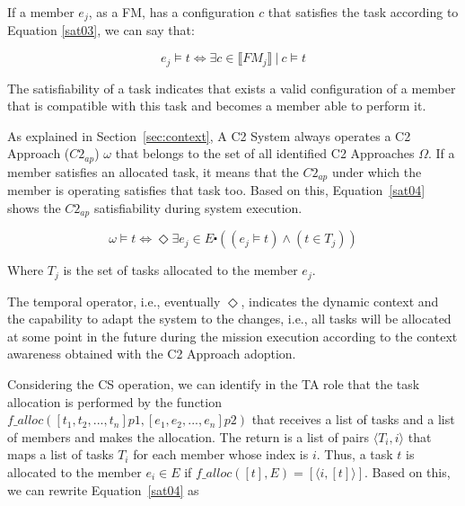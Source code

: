 

If a member $e_j$, as a FM, has a configuration $c$ that satisfies the task according to Equation \ref{sat03}, we can say that:

\begin{center}
\begin{equation}
\label{sat02}
e_j \models t \Longleftrightarrow \exists c \in \llbracket FM_j \rrbracket \ | \ c \models t
\end{equation}
\end{center}

The satisfiability of a task indicates that exists a valid configuration of a member that is compatible with this task and becomes a member able to perform it. 

As explained in Section~\ref{sec:context}, A C2 System always operates a C2 Approach ($C2_{ap}$) $\omega$ that belongs to the set of all identified C2 Approaches $\Omega$. If a member satisfies an allocated task, it means that the $C2_{ap}$ under which the member is operating satisfies that task too. Based on this, Equation~\ref{sat04} shows the $C2_{ap}$ satisfiability during system execution.

\begin{center}
\begin{equation}
\label{sat04}
\omega \models t \Longleftrightarrow  \Diamond \exists e_j \in E \centerdot  ((e_j \models t) \land (t \in T_j))
\end{equation}
\end{center}

Where $T_j$ is the set of tasks allocated to the member $e_j$.

The temporal operator, i.e., eventually $\Diamond$, indicates the dynamic context and the capability to adapt the system to the changes, i.e., all tasks will be allocated at some point in the future during the mission execution according to the context awareness obtained with the C2 Approach adoption.

Considering the CS operation, we can identify in the TA role that the task allocation is performed by the function $f\_alloc([t_1, t_2, ..., t_n] p1, [e_1, e_2, ..., e_n] p2)$ that receives a list of tasks and a list of members and makes the allocation. The return is a list of pairs $\langle T_i, i \rangle$ that maps a list of tasks $T_i$ for each member whose index is $i$. Thus, a task $t$ is allocated to the member $e_i \in E$ if $f\_alloc([t],E)=[\langle i, [t] \rangle]$. Based on this, we can rewrite Equation~\ref{sat04} as

